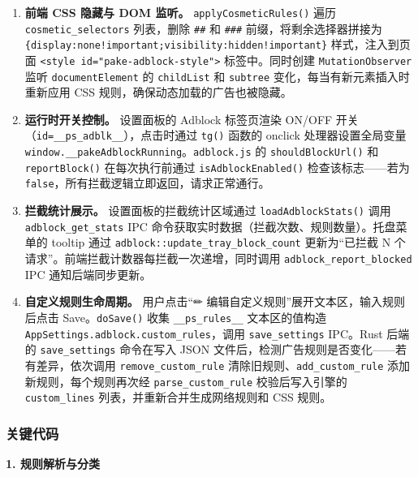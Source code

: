 \documentclass[12pt,a4paper]{ctexart}
\begin{document}
\begin{sloppypar}
\begin{enumerate}[label=(\arabic*)]
  \item \textbf{前端 CSS 隐藏与 DOM 监听。}
    \texttt{applyCosmeticRules()} 遍历 \texttt{cosmetic\_selectors} 列表，删除 \texttt{\#\#} 和 \texttt{\#\#\#} 前缀，将剩余选择器拼接为 \texttt{\{display:none!important;visibility:hidden!important\}} 样式，注入到页面 \texttt{<style id="pake-adblock-style">} 标签中。同时创建 \texttt{MutationObserver} 监听 \texttt{documentElement} 的 \texttt{childList} 和 \texttt{subtree} 变化，每当有新元素插入时重新应用 CSS 规则，确保动态加载的广告也被隐藏。

  \item \textbf{运行时开关控制。}
    设置面板的 Adblock 标签页渲染 ON/OFF 开关（\texttt{id=\_\_ps\_adblk\_\_}），点击时通过 \texttt{tg()} 函数的 onclick 处理器设置全局变量 \texttt{window.\_\_pakeAdblockRunning}。\texttt{adblock.js} 的 \texttt{shouldBlockUrl()} 和 \texttt{reportBlock()} 在每次执行前通过 \texttt{isAdblockEnabled()} 检查该标志——若为 \texttt{false}，所有拦截逻辑立即返回，请求正常通行。

  \item \textbf{拦截统计展示。}
    设置面板的拦截统计区域通过 \texttt{loadAdblockStats()} 调用 \texttt{adblock\_get\_stats} IPC 命令获取实时数据（拦截次数、规则数量）。托盘菜单的 tooltip 通过 \texttt{adblock::update\_tray\_block\_count} 更新为``已拦截 N 个请求''。前端拦截计数器每拦截一次递增，同时调用 \texttt{adblock\_report\_blocked} IPC 通知后端同步更新。

  \item \textbf{自定义规则生命周期。}
    用户点击``✏ 编辑自定义规则''展开文本区，输入规则后点击 Save。\texttt{doSave()} 收集 \texttt{\_\_ps\_rules\_\_} 文本区的值构造 \texttt{AppSettings.adblock.custom\_rules}，调用 \texttt{save\_settings} IPC。Rust 后端的 \texttt{save\_settings} 命令在写入 JSON 文件后，检测广告规则是否变化——若有差异，依次调用 \texttt{remove\_custom\_rule} 清除旧规则、\texttt{add\_custom\_rule} 添加新规则，每个规则再次经 \texttt{parse\_custom\_rule} 校验后写入引擎的 \texttt{custom\_lines} 列表，并重新合并生成网络规则和 CSS 规则。
\end{enumerate}
\end{sloppypar}

\subsubsection{关键代码}

\textbf{1. 规则解析与分类}
\end{document}
